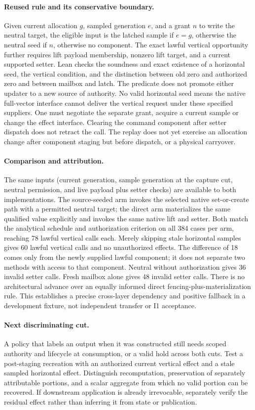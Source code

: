 \documentclass{article}
\begin{document}
\paragraph{Reused rule and its conservative boundary.}
Given current allocation \(g\), sampled generation \(e\), and a grant \(n\) to write the neutral target, the eligible input is the latched sample if \(e=g\), otherwise the neutral seed if \(n\), otherwise no component. The exact lawful vertical opportunity further requires lift payload membership, nonzero lift target, and a current supported setter. Lean checks the soundness and exact existence of a horizontal seed, the vertical condition, and the distinction between old zero and authorized zero and between mailbox and latch. The predicate does not promote either updater to a new source of authority. No valid horizontal seed means the native full-vector interface cannot deliver the vertical request under these specified suppliers. One must negotiate the separate grant, acquire a current sample or change the effect interface. Clearing the command component after setter dispatch does not retract the call. The replay does not yet exercise an allocation change after component staging but before dispatch, or a physical carryover.

\paragraph{Comparison and attribution.}
The same inputs (current generation, sample generation at the capture cut, neutral permission, and live payload plus setter checks) are available to both implementations. The source-seeded arm invokes the selected native set-or-create path with a permitted neutral target; the direct arm materializes the same qualified value explicitly and invokes the same native lift and setter. Both match the analytical schedule and authorization criterion on all 384 cases per arm, reaching 78 lawful vertical calls each. Merely skipping stale horizontal samples gives 60 lawful vertical calls and no unauthorized effects. The difference of 18 comes only from the newly supplied lawful component; it does not separate two methods with access to that component. Neutral without authorization gives 36 invalid setter calls. Fresh mailbox alone gives 48 invalid setter calls. There is no architectural advance over an equally informed direct fencing-plus-materialization rule. This establishes a precise cross-layer dependency and positive fallback in a development fixture, not independent transfer or I1 acceptance.

\paragraph{Next discriminating cut.}
A policy that labels an output when it was constructed still needs scoped authority and lifecycle at consumption, or a valid hold across both cuts. Test a post-staging recreation with an authorized current vertical effect and a stale sampled horizontal effect. Distinguish recomputation, preservation of separately attributable portions, and a scalar aggregate from which no valid portion can be recovered. If downstream application is already irrevocable, separately verify the residual effect rather than inferring it from state or publication.
\end{document}
